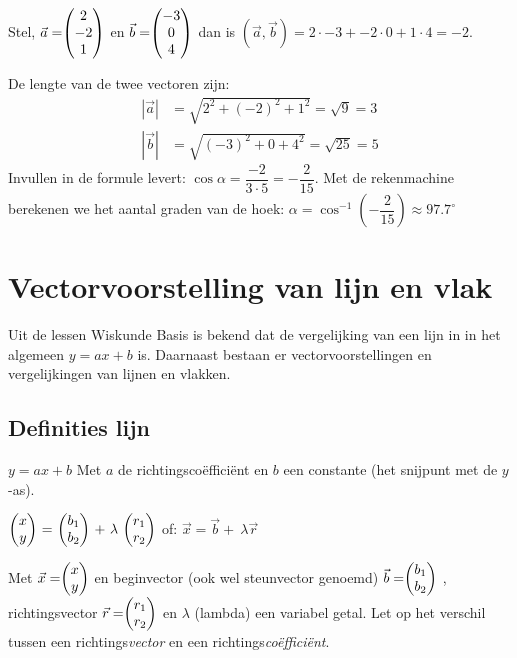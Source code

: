 

Stel, $\vec{a} = \vecdrie{2}{-2}{1} $ en $\vec{b} = \vecdrie{-3}{0}{4} $ \qquad dan is 
\qquad $ (\vec{a}, \vec{b}) = 2\cdot-3 + -2\cdot0  + 1\cdot4 = -2 $.
 
De lengte van de twee vectoren zijn: 
\begin{align*}
    |\vec{a}| &= \sqrt{2^2+(-2)^2+1^2} = \sqrt{9} = 3 \\ 
    |\vec{b}| &= \sqrt{(-3)^2+0+4^2} = \sqrt{25}=5
\end{align*}
Invullen in de formule levert: $\cos \alpha = \dfrac{-2}{3\cdot5} = - \dfrac{2}{15}. $  
Met de rekenmachine berekenen we het aantal graden van de hoek: $\alpha = \cos^{-1}(-\dfrac{2}{15}) \approx 97.7^{\circ} $ 

\section{Vectorvoorstelling van lijn en vlak}
Uit de lessen Wiskunde Basis is bekend dat de vergelijking van een lijn in \RT in het algemeen $ y = ax + b $ is.  Daarnaast bestaan er vectorvoorstellingen en vergelijkingen van lijnen en vlakken. 

\subsection{Definities lijn}
  {$ y = ax + b $} Met $a$ de richtingscoëfficiënt  en $b$ een constante (het snijpunt met de $y$-as).


{ $\vectwee{x}{y} \ = \ \vectweesnel{b} \ + \ \lambda\ \vectweesnel{r} $ \qquad  \qquad of: $\vec{x} = \vec{b}+ \ \lambda \vec{r} $} 

Met  $\vec{x}  =  \vectwee{x}{y} $ en beginvector (ook wel steunvector genoemd) $ \vec{b} =  \vectweesnel{b} $ ,  
richtingsvector $\vec{r} = \vectweesnel{r} $ en $\lambda$ (lambda) een variabel getal. Let op het verschil tussen een richtings\textit{vector} en een richtings\textit{coëfficiënt}.

